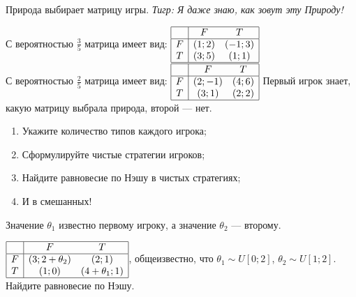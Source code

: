 \begin{problem}
Природа выбирает матрицу игры. {\it Тигр: Я даже знаю, как зовут эту Природу!}\par
С вероятностью  $\frac{3}{5} $  матрица имеет вид:  $\begin{array}{|c|cc|}  \hline {} & {F} & {T} \\  \hline {F} & {\left(1;2\right)} & {\left(-1;3\right)} \\ {T} & {\left(3;5\right)} & {\left(1;1\right)} \\  \hline  \end{array}$ \\
С вероятностью  $\frac{2}{5} $  матрица имеет вид:  $\begin{array}{|c|cc|}  \hline {} & {F} & {T} \\  \hline {F} & {\left(2;-1\right)} & {\left(4;6\right)} \\ {T} & {\left(3;1\right)} & {\left(2;2\right)} \\  \hline  \end{array}$
Первый игрок знает, какую матрицу выбрала природа, второй --- нет.\par
\begin{enumerate}
\item	Укажите количество типов каждого игрока;\par
\item 	Сформулируйте чистые стратегии игроков;\par
\item 	Найдите равновесие по Нэшу в чистых стратегиях;\par
\item	И в смешанных!\par
\end{enumerate}


\begin{sol}

\end{sol}
\end{problem}



\begin{problem}
Значение  $\theta _{1} $  известно первому игроку, а значение  $\theta _{2} $  --- второму.

 $\begin{array}{|c|cc|}  \hline {} & {F} & {T} \\  \hline {F} & {\left(3;2+\theta _{2} \right)} & {\left(2;1\right)} \\ {T} & {\left(1;0\right)} & {\left(4+\theta _{1} ;1\right)} \\  \hline  \end{array}$, общеизвестно, что  $\theta _{1} \sim U\left[0;2\right]$,  $\theta _{2} \sim U\left[1;2\right]$.\\
Найдите равновесие по Нэшу.



\begin{sol}

\end{sol}
\end{problem}



